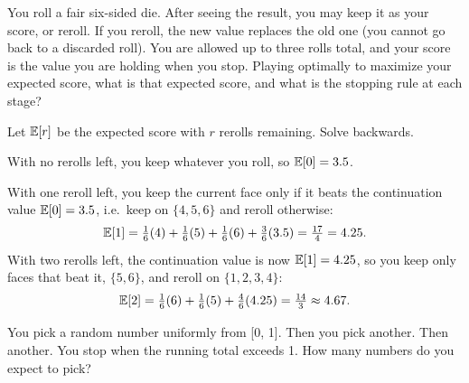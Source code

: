 \newpage

\begin{problem}
You roll a fair six-sided die. After seeing the result, you may keep it as your score, or reroll. If you reroll, the new value replaces the old one (you cannot go back to a discarded roll). You are allowed up to three rolls total, and your score is the value you are holding when you stop. Playing optimally to maximize
your expected score, what is that expected score, and what is the stopping rule at each stage?
\end{problem}

\begin{solution}
Let $\mathbb{E}[r]$ be the expected score with $r$ rerolls remaining. Solve backwards.

With no rerolls left, you keep whatever you roll, so $\mathbb{E}[0] = 3.5$.

With one reroll left, you keep the current face only if it beats the continuation value $\mathbb{E}[0] = 3.5$, i.e.\ keep on $\{4,5,6\}$ and reroll otherwise:
\[
\mathbb{E}[1] = \tfrac{1}{6}(4) + \tfrac{1}{6}(5) + \tfrac{1}{6}(6) + \tfrac{3}{6}(3.5) = \tfrac{17}{4} = 4.25.
\]
With two rerolls left, the continuation value is now $\mathbb{E}[1] = 4.25$, so you keep only faces that beat it, $\{5,6\}$, and reroll on $\{1,2,3,4\}$:
\[
\mathbb{E}[2] = \tfrac{1}{6}(6) + \tfrac{1}{6}(5) + \tfrac{4}{6}(4.25) = \tfrac{14}{3} \approx 4.67.
\]
\end{solution}


\begin{problem}
You pick a random number uniformly from [0, 1]. Then you pick another. Then another. You stop when the running total exceeds 1. How many numbers do you expect to pick?
\end{problem}

